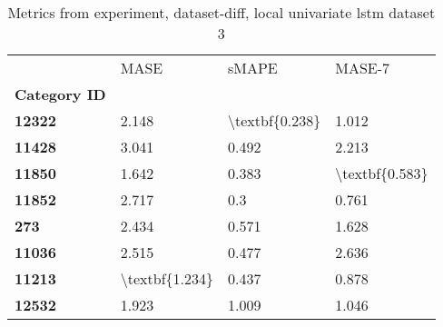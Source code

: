 \begin{table}[h]
\centering
\caption{Metrics from experiment, dataset-diff, local univariate lstm dataset 3}
\label{table:local-univariate-lstm-dataset-3-dataset-diff}
\begin{tabular}{llll}
\toprule
{} &            MASE &           sMAPE &          MASE-7 \\
\textbf{Category ID} &                 &                 &                 \\
\midrule
\textbf{12322      } &           2.148 &  \textbackslash textbf\{0.238\} &           1.012 \\
\textbf{11428      } &           3.041 &           0.492 &           2.213 \\
\textbf{11850      } &           1.642 &           0.383 &  \textbackslash textbf\{0.583\} \\
\textbf{11852      } &           2.717 &             0.3 &           0.761 \\
\textbf{273        } &           2.434 &           0.571 &           1.628 \\
\textbf{11036      } &           2.515 &           0.477 &           2.636 \\
\textbf{11213      } &  \textbackslash textbf\{1.234\} &           0.437 &           0.878 \\
\textbf{12532      } &           1.923 &           1.009 &           1.046 \\
\bottomrule
\end{tabular}
\end{table}

